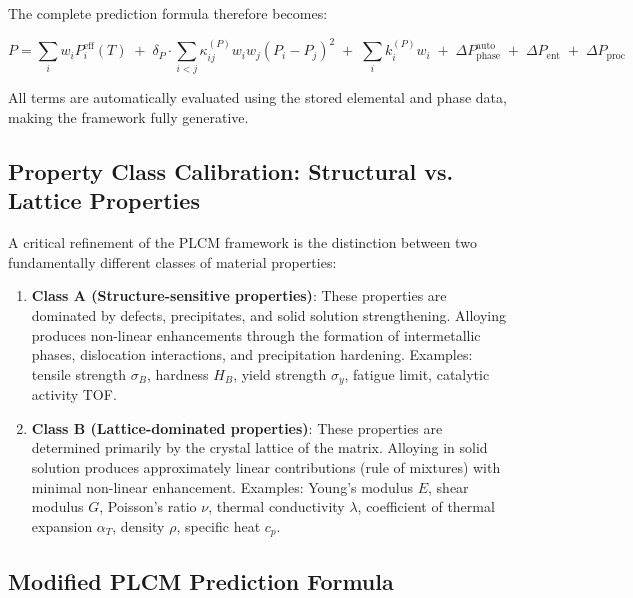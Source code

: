 \documentclass[12pt,a4paper]{article}
\begin{document}
	The complete prediction formula therefore becomes:
	
	\begin{equation}
		\boxed{
			P = \sum_i w_i P_i^{\text{eff}}(T) \;+\; \delta_P \cdot \sum_{i<j} \kappa_{ij}^{(P)} w_i w_j (P_i - P_j)^2 \;+\; \sum_i k_i^{(P)} w_i \;+\; \Delta P_{\text{phase}}^{\text{auto}} \;+\; \Delta P_{\text{ent}} \;+\; \Delta P_{\text{proc}}
		}
		\label{eq:plcm-full-auto}
	\end{equation}
	
	All terms are automatically evaluated using the stored elemental and phase data, making the framework fully generative.
	
	\subsection{Property Class Calibration: Structural vs. Lattice Properties}
	\label{subsec:property-class-calibration}
	
	A critical refinement of the PLCM framework is the distinction between two fundamentally different classes of material properties:
	
	\begin{enumerate}
		\item \textbf{Class A (Structure-sensitive properties)}: These properties are dominated by defects, precipitates, and solid solution strengthening. Alloying produces non-linear enhancements through the formation of intermetallic phases, dislocation interactions, and precipitation hardening. Examples: tensile strength \(\sigma_B\), hardness \(H_B\), yield strength \(\sigma_y\), fatigue limit, catalytic activity TOF.
		
		\item \textbf{Class B (Lattice-dominated properties)}: These properties are determined primarily by the crystal lattice of the matrix. Alloying in solid solution produces approximately linear contributions (rule of mixtures) with minimal non-linear enhancement. Examples: Young's modulus \(E\), shear modulus \(G\), Poisson's ratio \(\nu\), thermal conductivity \(\lambda\), coefficient of thermal expansion \(\alpha_T\), density \(\rho\), specific heat \(c_p\).
	\end{enumerate}
	
	\subsection{Modified PLCM Prediction Formula}
	
\end{document}
